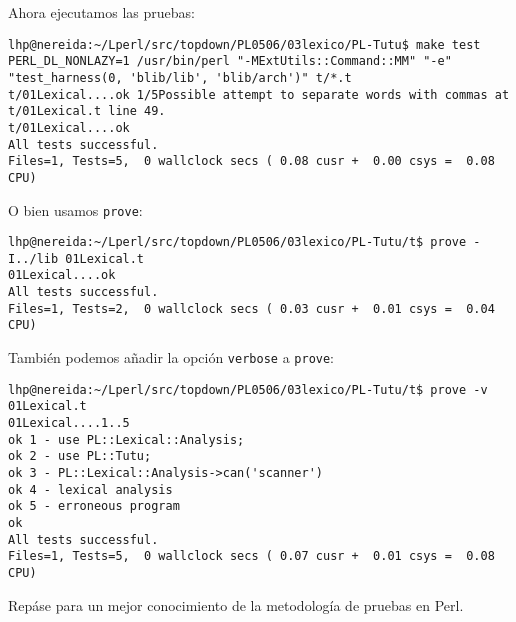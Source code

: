 Ahora ejecutamos las pruebas:
\begin{verbatim}
lhp@nereida:~/Lperl/src/topdown/PL0506/03lexico/PL-Tutu$ make test
PERL_DL_NONLAZY=1 /usr/bin/perl "-MExtUtils::Command::MM" "-e" "test_harness(0, 'blib/lib', 'blib/arch')" t/*.t
t/01Lexical....ok 1/5Possible attempt to separate words with commas at t/01Lexical.t line 49.
t/01Lexical....ok
All tests successful.
Files=1, Tests=5,  0 wallclock secs ( 0.08 cusr +  0.00 csys =  0.08 CPU)
\end{verbatim}
O bien usamos \verb|prove|:
\begin{verbatim}
lhp@nereida:~/Lperl/src/topdown/PL0506/03lexico/PL-Tutu/t$ prove -I../lib 01Lexical.t
01Lexical....ok
All tests successful.
Files=1, Tests=2,  0 wallclock secs ( 0.03 cusr +  0.01 csys =  0.04 CPU)
\end{verbatim}
También podemos añadir la opción \verb|verbose| a \verb|prove|:
\begin{verbatim}
lhp@nereida:~/Lperl/src/topdown/PL0506/03lexico/PL-Tutu/t$ prove -v 01Lexical.t
01Lexical....1..5
ok 1 - use PL::Lexical::Analysis;
ok 2 - use PL::Tutu;
ok 3 - PL::Lexical::Analysis->can('scanner')
ok 4 - lexical analysis
ok 5 - erroneous program
ok
All tests successful.
Files=1, Tests=5,  0 wallclock secs ( 0.07 cusr +  0.01 csys =  0.08 CPU)
\end{verbatim}

Repáse 
 para un mejor conocimiento
de la metodología de pruebas en Perl.

